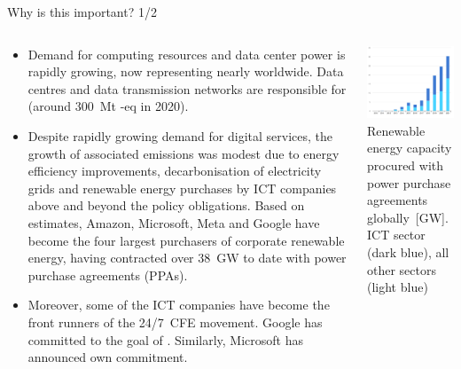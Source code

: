 \begin{frame}{Why is this important? 1/2}

  {\footnotesize

  \begin{columns}[T]
    \begin{column}{9cm}
      \begin{itemize}
        \item   
        Demand for computing resources and data center power is rapidly growing, now representing nearly  worldwide. 
        Data centres and data transmission networks are responsible for  (around 300~Mt \co-eq in 2020).
      
        \item Despite rapidly growing demand for digital services, the growth of associated emissions was modest due to energy efficiency improvements, decarbonisation of electricity grids and renewable energy purchases by ICT companies above and beyond the policy obligations. Based on  estimates, Amazon, Microsoft, Meta and Google have become the four largest purchasers of corporate renewable energy, having contracted over 38~GW to date with power purchase agreements (PPAs).
      
        \item Moreover, some of the ICT companies have become the front runners of the 24/7~CFE movement. Google has committed to the goal of . Similarly, Microsoft has announced own  commitment.

      \end{itemize}
      \end{column}
  
      \begin{column}{6cm}
      \centering
      \vspace{.3cm}
      \includegraphics[width=6cm]{images/iea-PPAbysector-2010-2021.png}
      {\scriptsize
      Renewable energy capacity procured with power purchase agreements globally~[GW]. \\
      ICT sector (dark blue), all other sectors (light blue)}
    \end{column}
  

\end{columns}}
\end{frame}
